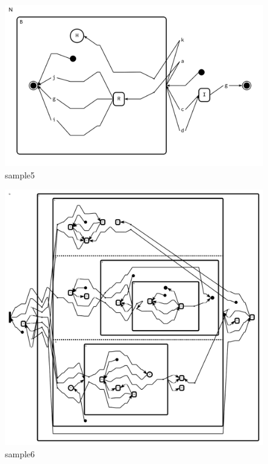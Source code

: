 \begin{figure}[ht]
    \centering
    \includegraphics[scale=0.5]{Bilder/sample5.png}
    \caption{sample5}
    \label{fig:sample5}
\end{figure}
\begin{figure}[ht]
    \centering
    \includegraphics[scale=0.7]{Bilder/sample6.png}
    \caption{sample6}
    \label{fig:sample6}
\end{figure}